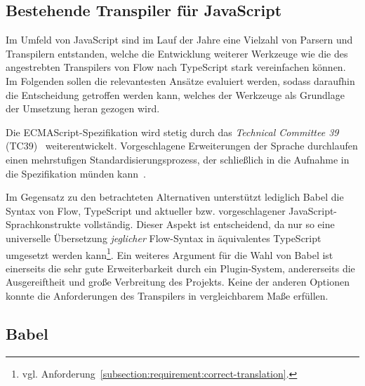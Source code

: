 
\subsection{Bestehende Transpiler für JavaScript}
\label{subsec:js-transpilers}


Im Umfeld von JavaScript sind im Lauf der Jahre eine Vielzahl von Parsern und Transpilern entstanden, welche die Entwicklung weiterer Werkzeuge wie die des angestrebten Transpilers von Flow nach TypeScript stark vereinfachen können. Im Folgenden sollen die relevantesten Ansätze evaluiert werden, sodass daraufhin die Entscheidung getroffen werden kann, welches der Werkzeuge als Grundlage der Umsetzung heran gezogen wird.




Die ECMAScript-Spezifikation wird stetig durch das \textit{Technical Committee 39} (TC39)~\autocite{TC39_COMMITTEE} weiterentwickelt. Vorgeschlagene Erweiterungen der Sprache durchlaufen einen mehrstufigen Standardisierungsprozess, der schließlich in die Aufnahme in die Spezifikation münden kann~\autocite{TC39_PROCESS}.

Im Gegensatz zu den betrachteten Alternativen unterstützt lediglich Babel die Syntax von Flow, TypeScript und aktueller bzw. vorgeschlagener JavaScript-Sprachkonstrukte vollständig. Dieser Aspekt ist entscheidend, da nur so eine universelle Übersetzung \emph{jeglicher} Flow-Syntax in äquivalentes TypeScript umgesetzt werden kann\footnote{vgl. Anforderung~\ref{subsection:requirement:correct-translation}.}.
Ein weiteres Argument für die Wahl von Babel ist einerseits die sehr gute Erweiterbarkeit durch ein Plugin-System, andererseits die Ausgereiftheit und große Verbreitung des Projekts. Keine der anderen Optionen konnte die Anforderungen des Transpilers in vergleichbarem Maße erfüllen.

\subsection{Babel}
\label{sec:babel}

